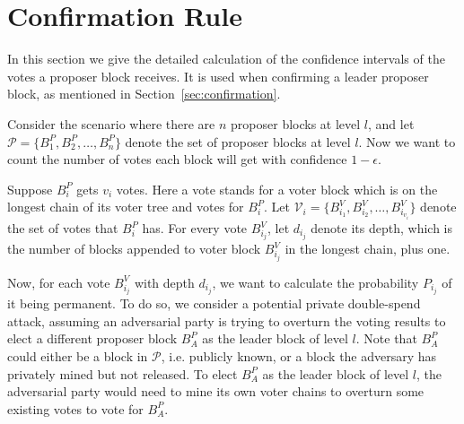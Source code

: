 \chapter{Confirmation Rule}
\label{apx:confirmation}

In this section we give the detailed calculation of the confidence intervals of the votes a proposer block receives. It is used when confirming a leader proposer block, as mentioned in Section~\ref{sec:confirmation}.

Consider the scenario where there are $n$ proposer blocks at level $l$, and let $\mathcal P =\{B^P_1, B^P_2, \ldots, B^P_n\}$ denote the set of proposer blocks at level $l$. Now we want to count the number of votes each block will get with confidence $1-\epsilon$.

Suppose $B^P_i$ gets $v_i$ votes. Here a vote stands for a voter block which is on the longest chain of its voter tree and votes for $B^P_i$. 
Let $\mathcal V_i =\{B^V_{i_1}, B^V_{i_2}, \ldots, B^V_{i_{v_i}}\}$ denote the set of votes that $B^P_i$ has. For every vote $B^V_{i_j}$, let $d_{i_j}$ denote its depth, which is the number of blocks appended to voter block $B^V_{i_j}$ in the longest chain, plus one.

Now, for each vote $B^V_{i_j}$ with depth $d_{i_j}$, we want to calculate the probability $P_{i_j}$ of it being permanent. 
To do so, we consider a potential private double-spend attack, assuming an adversarial party is trying to overturn the voting results to elect a different proposer block $B^P_A$ as the leader block of level $l$. 
Note that $B^P_A$ could either be a block in $\mathcal P$, i.e. publicly known, or a block the adversary has privately mined but not released. 
To elect $B^P_A$ as the leader block of level $l$, the adversarial party would need to mine its own voter chains to overturn some existing votes to vote for $B^P_A$. 


